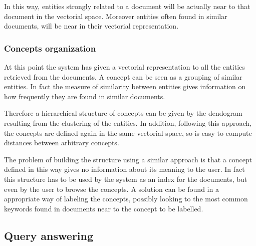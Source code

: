 \documentclass{acm_proc_article-sp-sigmod07}
\begin{document}
In this way, entities strongly related to a document will be actually near
to that document in the vectorial space. Moreover entities often found in
similar documents, will be near in their vectorial representation.

\subsubsection{Concepts organization}
At this point the system has given a vectorial representation to all the
entities retrieved from the documents. A concept can be seen as a grouping
of similar entities. In fact the measure of similarity between entities
gives information on how frequently they are found in similar documents.

Therefore a hierarchical structure of concepts can be given by the
dendogram resulting from the clustering of the entities.
In addition, following this approach, the concepts are defined again in
the same vectorial space, so is easy to compute distances between
arbitrary concepts.

The problem of building the structure using a similar approach is that
a concept defined in this way gives no information about its meaning to
the user.
In fact this structure has to be used by the system as an index for the
documents, but even by the user to browse the concepts.
A solution can be found in a appropriate way of labeling the concepts,
possibly looking to the most common keywords found in documents near to
the concept to be labelled. 

\subsection{Query answering}






\newpage
\null
\newpage
\end{document}
